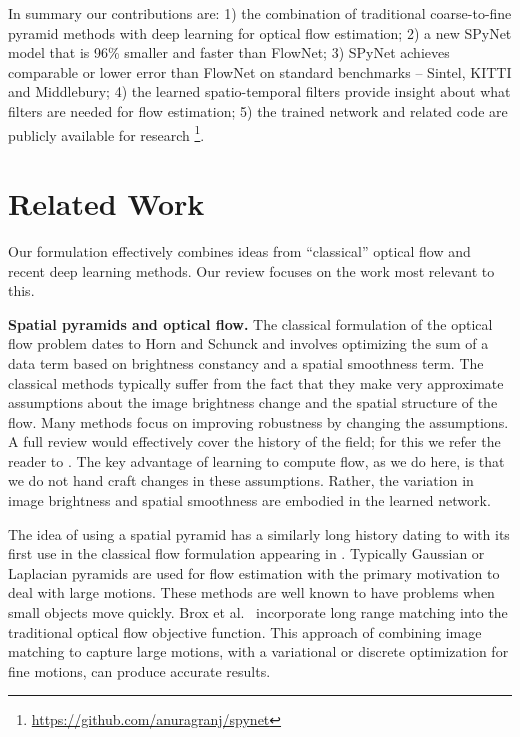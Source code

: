 \documentclass[10pt,twocolumn,letterpaper]{article}
\begin{document}
In summary our contributions are:
1) the combination of traditional coarse-to-fine pyramid methods with deep learning for optical flow estimation;
2) a new SPyNet model that is 96\% smaller and faster than FlowNet;
3) SPyNet achieves comparable or lower error than FlowNet on standard benchmarks -- Sintel, KITTI and Middlebury;
4) the learned spatio-temporal filters provide insight about what filters are needed for flow estimation;
5) the trained network and related code are publicly available for research \footnote{\url{https://github.com/anuragranj/spynet}}.%


\section{Related Work}
Our formulation effectively combines ideas from ``classical'' optical flow and recent deep learning methods.
Our review focuses on the work most relevant to this.


{\bf Spatial pyramids and optical flow.}
The classical formulation of the optical flow problem dates to Horn and Schunck \cite{horn1981determining} and involves optimizing the sum
of a data term based on brightness constancy and a spatial smoothness term.
The classical methods typically suffer from the fact that they make very approximate assumptions about the image brightness change and the spatial structure of the flow.
Many methods focus on improving robustness by changing the assumptions.
A full review would effectively cover the history of the field; for this we refer the reader to \cite{sun2014quantitative}. %
The key advantage of learning to compute flow, as we do here, is that we do not hand craft changes in these assumptions.
Rather, the variation in image brightness and spatial smoothness are embodied in the learned network.


The idea of using a spatial pyramid has a similarly long history dating to \cite{burt-adelson} with its first use in the classical flow formulation appearing in
\cite{glazer-thesis}. 
Typically Gaussian or Laplacian pyramids are used for flow estimation with the primary motivation to deal with large motions.
These methods are well known to have problems when small objects move quickly.
Brox et al.~\cite{brox2009large} incorporate long range matching into the traditional optical flow objective function.
This approach of combining image matching to capture large motions, with a variational \cite{epicflow} or discrete optimization \cite{guney2016ACCV} for fine motions, can produce accurate results.
\end{document}
